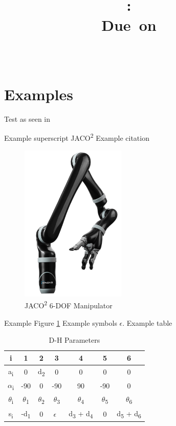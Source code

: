 \documentclass{article}
\title{
\vspace{2in}
\textmd{\textbf{\hmwkClass:\ \hmwkTitle}}\\
\normalsize\vspace{0.1in}\large{Due\ on\ \hmwkDueDate}\\
\vspace{0.1in}\large{\textit{\hmwkClassInstructor\ \hmwkClassTime}}\\
\vspace{3in}
}
\author{\textbf{\hmwkAuthorName}}
\date{} %
\begin{document}
\maketitle



\newpage
\tableofcontents
\listoffigures
\listoftables
\newpage

\section{Examples}
Test as seen in \cite{kane}

Example superscript JACO\textsuperscript{2} Example citation \cite{weisz2017assistive}

\begin{figure}[h!]
	\centering
	\includegraphics[width=5cm,keepaspectratio]{kinova.png}
	\caption{JACO\textsuperscript{2} 6-DOF Manipulator}
	\label{fig:diagram1}
\end{figure}

Example Figure \ref{fig:diagram1} Example symbols $\epsilon$. Example table

\begin{table}[h!]
\centering
\begin{tabular}{ |c |c  |c |c |c  |c  |c |}
\hline
	 i & 1 & 2 & 3 & 4 & 5 & 6 \\ \hline
	 a\textsubscript{i} & 0 & d\textsubscript{2} & 0 & 0 & 0 & 0 \\ \hline
	 $\alpha$\textsubscript{i}  & -90 & 0 & -90 & 90 & -90 & 0 \\ \hline
	 $\theta$\textsubscript{i} & $\theta$\textsubscript{1} & $\theta$\textsubscript{2} & $\theta$\textsubscript{3} & $\theta$\textsubscript{4} & $\theta$\textsubscript{5} & $\theta$\textsubscript{6} \\ \hline
	 s\textsubscript{i} & -d\textsubscript{1} & 0 & $\epsilon$\ &  d\textsubscript{3} + d\textsubscript{4} & 0 & d\textsubscript{5} + d\textsubscript{6} \\ \hline
\end{tabular}
\caption{D-H Parameters}
\label{table:1}
\end{table}
\end{document}

